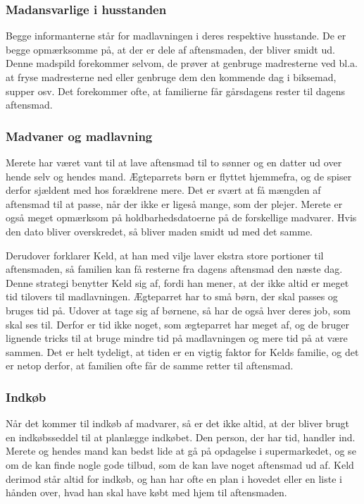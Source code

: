\subsubsection*{Madansvarlige i husstanden}
Begge informanterne står for madlavningen i deres respektive husstande. De er begge opmærksomme på, at der er dele af aftensmaden, der bliver smidt ud. Denne madspild forekommer selvom, de prøver at genbruge madresterne ved bl.a. at fryse madresterne ned eller genbruge dem den kommende dag i \fx biksemad, supper osv. Det forekommer ofte, at familierne får gårsdagens rester til dagens aftensmad.

\subsubsection*{Madvaner og madlavning}
Merete har været vant til at lave aftensmad til to sønner og en datter ud over hende selv og hendes mand. Ægteparrets børn er flyttet hjemmefra, og de spiser derfor sjældent med hos forældrene mere. Det er svært at få mængden af aftensmad til at passe, når der ikke er ligeså mange, som der plejer. Merete er også meget opmærksom på holdbarhedsdatoerne på de forskellige madvarer. Hvis den dato bliver overskredet, så bliver maden smidt ud med det samme.

Derudover forklarer Keld, at han med vilje laver ekstra store portioner til aftensmaden, så familien kan få resterne fra dagens aftensmad den næste dag. Denne strategi benytter Keld sig af, fordi han mener, at der ikke altid er meget tid tilovers til madlavningen. Ægteparret har to små børn, der skal passes og bruges tid på. Udover at tage sig af børnene, så har de også hver deres job, som skal ses til. Derfor er tid ikke noget, som ægteparret har meget af, og de bruger lignende tricks til at bruge mindre tid på madlavningen og mere tid på at være sammen. Det er helt tydeligt, at tiden er en vigtig faktor for Kelds familie, og det er netop derfor, at familien ofte får de samme retter til aftensmad.

\subsubsection*{Indkøb}
Når det kommer til indkøb af madvarer, så er det ikke altid, at der bliver brugt en indkøbsseddel til at planlægge indkøbet. Den person, der har tid, handler ind. Merete og hendes mand kan bedst lide at gå på opdagelse i supermarkedet, og se om de kan finde nogle gode tilbud, som de kan lave noget aftensmad ud af. Keld derimod står altid for indkøb, og han har ofte en plan i hovedet eller en liste i hånden over, hvad han skal have købt med hjem til aftensmaden.

